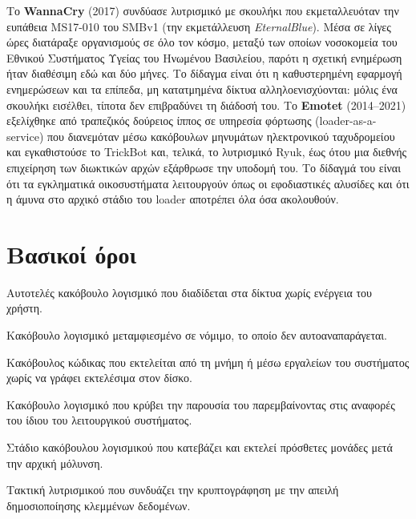 Το \textbf{WannaCry} (2017) συνδύασε λυτρισμικό με σκουλήκι που εκμεταλλευόταν την ευπάθεια MS17-010 του SMBv1 (την εκμετάλλευση \emph{EternalBlue}). Μέσα σε λίγες ώρες διατάραξε οργανισμούς σε όλο τον κόσμο, μεταξύ των οποίων νοσοκομεία του Εθνικού Συστήματος Υγείας του Ηνωμένου Βασιλείου, παρότι η σχετική ενημέρωση ήταν διαθέσιμη εδώ και δύο μήνες. Το δίδαγμα είναι ότι η καθυστερημένη εφαρμογή ενημερώσεων και τα επίπεδα, μη κατατμημένα δίκτυα αλληλοενισχύονται: μόλις ένα σκουλήκι εισέλθει, τίποτα δεν επιβραδύνει τη διάδοσή του. Το \textbf{Emotet} (2014–2021) εξελίχθηκε από τραπεζικός δούρειος ίππος σε υπηρεσία φόρτωσης (loader-as-a-service) που διανεμόταν μέσω κακόβουλων μηνυμάτων ηλεκτρονικού ταχυδρομείου και εγκαθιστούσε το TrickBot και, τελικά, το λυτρισμικό Ryuk, έως ότου μια διεθνής επιχείρηση των διωκτικών αρχών εξάρθρωσε την υποδομή του. Το δίδαγμά του είναι ότι τα εγκληματικά οικοσυστήματα λειτουργούν όπως οι εφοδιαστικές αλυσίδες και ότι η άμυνα στο αρχικό στάδιο του loader αποτρέπει όλα όσα ακολουθούν.

\section*{Βασικοί όροι}
\begin{description}[style=nextline,leftmargin=1.2em]
  \item[Σκουλήκι (worm)] Αυτοτελές κακόβουλο λογισμικό που διαδίδεται στα δίκτυα χωρίς ενέργεια του χρήστη.
  \item[Δούρειος ίππος] Κακόβουλο λογισμικό μεταμφιεσμένο σε νόμιμο, το οποίο δεν αυτοαναπαράγεται.
  \item[Κακόβουλο λογισμικό χωρίς αρχεία] Κακόβουλος κώδικας που εκτελείται από τη μνήμη ή μέσω εργαλείων του συστήματος χωρίς να γράφει εκτελέσιμα στον δίσκο.
  \item[Rootkit] Κακόβουλο λογισμικό που κρύβει την παρουσία του παρεμβαίνοντας στις αναφορές του ίδιου του λειτουργικού συστήματος.
  \item[Loader] Στάδιο κακόβουλου λογισμικού που κατεβάζει και εκτελεί πρόσθετες μονάδες μετά την αρχική μόλυνση.
  \item[Διπλός εκβιασμός] Τακτική λυτρισμικού που συνδυάζει την κρυπτογράφηση με την απειλή δημοσιοποίησης κλεμμένων δεδομένων.
\end{description}

